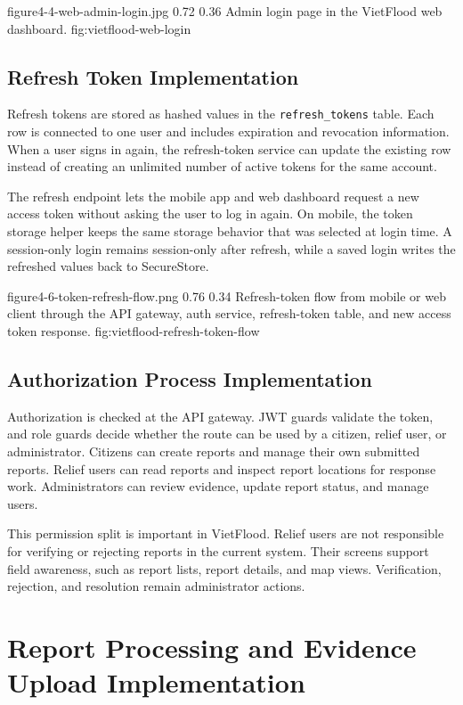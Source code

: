 \vfplaceholderfigure
    {figure4-4-web-admin-login.jpg}
    {0.72}
    {0.36}
    {Admin login page in the VietFlood web dashboard.}
    {fig:vietflood-web-login}

\subsection{Refresh Token Implementation}

Refresh tokens are stored as hashed values in the \texttt{refresh\_tokens} table. Each row is connected to one user and includes expiration and revocation information. When a user signs in again, the refresh-token service can update the existing row instead of creating an unlimited number of active tokens for the same account.

The refresh endpoint lets the mobile app and web dashboard request a new access token without asking the user to log in again. On mobile, the token storage helper keeps the same storage behavior that was selected at login time. A session-only login remains session-only after refresh, while a saved login writes the refreshed values back to SecureStore.

\vfplaceholderfigure
    {figure4-6-token-refresh-flow.png}
    {0.76}
    {0.34}
    {Refresh-token flow from mobile or web client through the API gateway, auth service, refresh-token table, and new access token response.}
    {fig:vietflood-refresh-token-flow}

\subsection{Authorization Process Implementation}

Authorization is checked at the API gateway. JWT guards validate the token, and role guards decide whether the route can be used by a citizen, relief user, or administrator. Citizens can create reports and manage their own submitted reports. Relief users can read reports and inspect report locations for response work. Administrators can review evidence, update report status, and manage users.

This permission split is important in VietFlood. Relief users are not responsible for verifying or rejecting reports in the current system. Their screens support field awareness, such as report lists, report details, and map views. Verification, rejection, and resolution remain administrator actions.

\section{Report Processing and Evidence Upload Implementation}

